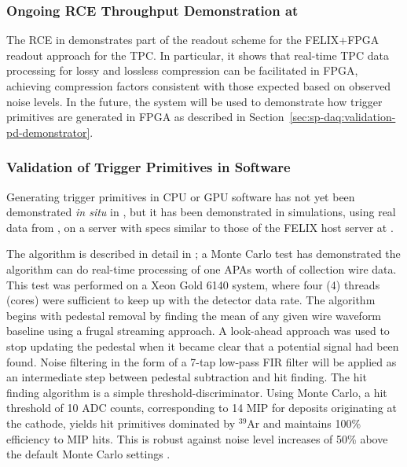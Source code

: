 \subsubsection{Ongoing RCE Throughput Demonstration at }
\label{sec:sp-daq:validation-pdune-rce}

The RCE  in  demonstrates part of the readout scheme for
the FELIX+FPGA readout approach for the TPC. In particular, it
shows that real-time TPC data processing for lossy
and lossless compression can be facilitated in FPGA, achieving
compression factors consistent with those expected based on observed
 noise levels. In the future, the system will be used
to demonstrate how trigger primitives are generated in FPGA as
described in Section~\ref{sec:sp-daq:validation-pd-demonstrator}.

\subsubsection{Validation of Trigger Primitives in Software}
\label{sec:sp-daq:validation-software-trigger-primitives}

Generating trigger primitives in CPU or GPU software has not
yet been demonstrated \textit{in situ} in , but it has been
demonstrated in simulations, using real data from , on a
server with specs similar to those 
of the FELIX host server at .

The algorithm is described in detail in \cite{docid-11236}; a Monte Carlo test has demonstrated the algorithm can do real-time processing of one APAs worth
of collection wire data. This test was performed on a Xeon Gold 6140
system, where four (4) threads (cores) were sufficient to keep
up with the detector data rate. The algorithm begins with pedestal removal by
finding the mean of any given wire waveform baseline using a frugal
streaming approach. A look-ahead approach was used to stop
updating the pedestal when it became clear that a potential signal
had been found. Noise filtering in the form of a 7-tap low-pass FIR
filter will be applied as an intermediate step
between pedestal subtraction and hit finding. The hit finding
algorithm is a simple threshold-discriminator. Using Monte Carlo, a hit
threshold of 10 ADC counts, corresponding to 1\/4 MIP for deposits originating at the cathode, yields hit primitives dominated by
$^39$Ar and maintains 100\% efficiency to MIP hits. This is robust against noise level 
increases of 50\% above the default  Monte Carlo settings \cite{docid-11275}. 

